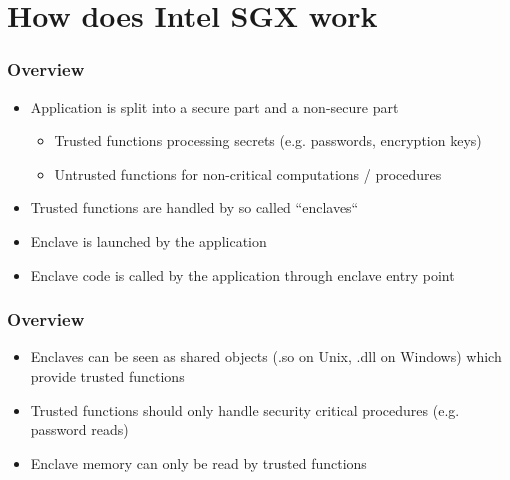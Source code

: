 \section{How does Intel SGX work}

\begin{frame}
    \frametitle{Overview}
    \begin{itemize}[<+->]
        \item Application is split into a secure part and a non-secure part
        \begin{itemize}
            \item Trusted functions processing secrets (e.g. passwords, encryption keys)
            \item Untrusted functions for non-critical computations / procedures
        \end{itemize}
        \item Trusted functions are handled by so called ``enclaves``
        \item Enclave is launched by the application
        \item Enclave code is called by the application through enclave entry point
    \end{itemize}
\end{frame}

\begin{frame}
    \frametitle{Overview}
    \begin{itemize}[<+->]
        \item Enclaves can be seen as shared objects (.so on Unix, .dll on Windows) which provide trusted functions
        \item Trusted functions should only handle security critical procedures (e.g. password reads)
        \item Enclave memory can only be read by trusted functions
    \end{itemize}
    $ $ \newline
    \centering
\end{frame}



